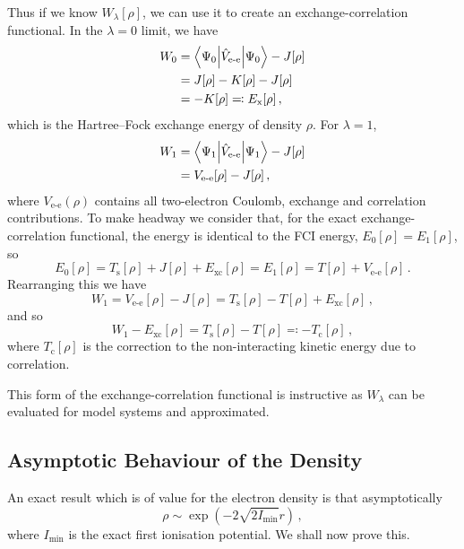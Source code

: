\documentclass{article}
\theoremstyle{plain}\theoremheaderfont{\normalfont\itshape}\theorembodyfont{\rmfamily}\theoremseparator{.}\newtheorem*{rem}{Remark}\newtheorem*{ex}{Example}\newtheorem*{proof}{Proof}\newtheorem*{altp}{Alternative proof}
\theoremstyle{plain}\theoremheaderfont{\normalfont\bfseries}\theorembodyfont{\rmfamily}\theoremseparator{.}\newtheorem{thm}{Theorem}[section]\newtheorem{lem}[thm]{Lemma}\newtheorem{prop}[thm]{Proposition}\newtheorem*{cor}{Corollary}\newtheorem{defn}[thm]{Definition}\newtheorem{clm}[thm]{Claim}\newtheorem{clminproof}{Claim}
\theoremstyle{break}\theoremheaderfont{\normalfont\itshape}\theorembodyfont{\rmfamily}\theoremseparator{.\medskip}\newtheorem*{proofskip}{Proof}\newtheorem*{exs}{Examples}\newtheorem*{rems}{Remarks}
\theoremstyle{break}\theoremheaderfont{\normalfont\bfseries}\theorembodyfont{\rmfamily}\theoremseparator{.\medskip}\newtheorem{lemskip}[thm]{Lemma}\newtheorem{defnskip}[thm]{Definition}\newtheorem{propskip}[thm]{Proposition}\newtheorem{thmskip}[thm]{Theorem}
\numberwithin{equation}{section}
\newcommand{\expval}[2]{\left\langle #2 \middle| #1 \middle| #2 \right\rangle}
\newcommand{\ee}{_{\text{e-e}}}
\newcommand{\s}{_{\text{s}}}
\newcommand{\x}{_{\text{x}}}
\newcommand{\corr}{_{\text{c}}}
\newcommand{\xc}{_{\text{xc}}}
\begin{document}
    Thus if we know \(W_\lambda[\rho]\), we can use it to create an exchange-correlation functional. In the \(\lambda=0\) limit, we have
    \begin{align}
        W_0&=\expval{\hat{V}\ee}{\Psi_0}-J[\rho]\notag\\
        &=J[\rho]-K[\rho]-J[\rho]\notag\\
        &=-K[\rho]\eqqcolon E\x[\rho]\,,
    \end{align}
    which is the Hartree--Fock exchange energy of density \(\rho\). For \(\lambda=1\),
    \begin{align}
        W_1&=\expval{\hat{V}\ee}{\Psi_1}-J[\rho]\notag\\
        &=V\ee[\rho]-J[\rho]\,,
    \end{align}
    where \(V\ee(\rho)\) contains all two-electron Coulomb, exchange and correlation contributions. To make headway we consider that, for the exact exchange-correlation functional, the energy is identical to the FCI energy, \(E_0[\rho]=E_1[\rho]\), so
    \begin{equation}
        E_{0}[\rho]=T\s[\rho]+J[\rho]+E\xc[\rho]=E_1[\rho]=T[\rho]+V\ee[\rho]\,.
    \end{equation}
    Rearranging this we have
    \begin{equation}
        W_1=V\ee[\rho]-J[\rho]=T\s[\rho]-T[\rho]+E\xc[\rho]\,,
    \end{equation}
    and so
    \begin{equation}
        W_1-E\xc[\rho]=T\s[\rho]-T[\rho]\eqqcolon -T\corr[\rho]\,,
    \end{equation}
    where \(T\corr[\rho]\) is the correction to the non-interacting kinetic energy due to correlation.

    This form of the exchange-correlation functional is instructive as \(W_\lambda\) can be evaluated for model systems and approximated.
    \subsection{Asymptotic Behaviour of the Density}
    An exact result which is of value for the electron density is that asymptotically
    \begin{equation}
        \rho\sim\exp(-2\sqrt{2I_{\text{min}}}r)\,,
    \end{equation}
    where \(I_{\text{min}}\) is the exact first ionisation potential. We shall now prove this.
\end{document}
